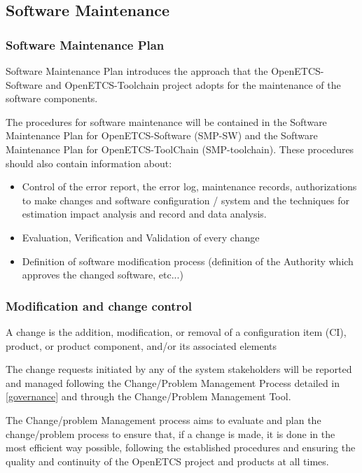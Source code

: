 \documentclass{template/openetcs_article}
\begin{document}
\subsection{Software Maintenance}
\subsubsection{Software Maintenance Plan}
Software Maintenance Plan introduces the approach that the OpenETCS-Software and OpenETCS-Toolchain project adopts for the maintenance of the software components.

The procedures for software maintenance will be contained in the Software Maintenance Plan for OpenETCS-Software (SMP-SW) and the Software Maintenance Plan for OpenETCS-ToolChain (SMP-toolchain). These procedures should also contain information about:
\begin{itemize}
\item Control of the error report, the error log, maintenance records, authorizations to make changes and software configuration / system and the techniques for estimation impact analysis and record and data analysis.
\item Evaluation, Verification and Validation of every change
\item Definition of software modification process (definition of the Authority which approves the changed software, etc...)
\end{itemize}


\subsubsection{Modification and change control }

A change is the addition, modification, or removal of a configuration item (CI), product, or product component, and/or its associated elements

The change requests initiated by any of the system stakeholders will be reported and managed following the Change/Problem Management Process  \citep{emp} detailed in \href{https://github.com/openETCS/governance/tree/master/Change-Problem%20Process}{[governance]} and through the Change/Problem Management Tool.

The Change/problem Management process aims to evaluate and plan the change/problem process to ensure that, if a change is made, it is done in the most efficient way possible, following the established procedures and ensuring the quality and continuity of the OpenETCS project and products at all times.
\end{document}
